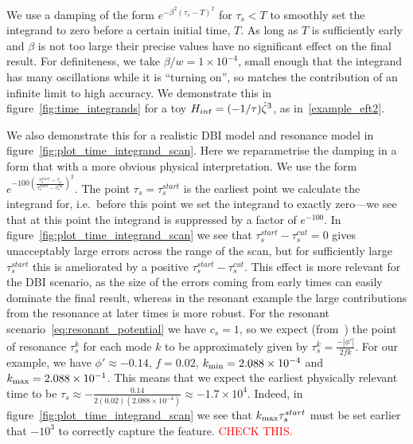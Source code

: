 We use a damping of the form $e^{-\beta^2{(\tau_s-T)}^2}$ for $\tau_s<T$ to smoothly
set the integrand to zero before a certain initial time, $T$.
As long as $T$ is sufficiently early and $\beta$ is not too large
their precise values have no significant effect on the final result.
For definiteness, we take $\beta/w=1\times10^{-4}$, small enough that
the integrand has many oscillations while it is ``turning on'',
so matches the contribution of an infinite limit to high accuracy.
We demonstrate this in figure~\ref{fig:time_integrands}
for a toy $H_{int}=(-1/\tau)\dot{\zeta}^3$,
as in~\eqref{example_eft2}.


We also demonstrate this for a realistic DBI model and resonance model
in figure~\ref{fig:plot_time_integrand_scan}.
Here we reparametrise the damping in a form that with a more obvious physical
interpretation.
We use the form $e^{-100{\left(\frac{{\tau_s^{start}-\tau_s}}{\tau_s^{start}-\tau_s^{cut}}\right)}^2}$.
The point $\tau_s=\tau_s^{start}$ is the earliest point we calculate the integrand for,
i.e.\ before this point we set the integrand to exactly zero---we
see that at this point the integrand is suppressed by a factor of $e^{-100}$.
In figure~\ref{fig:plot_time_integrand_scan} we see that $\tau_s^{start}-\tau_s^{cut}=0$
gives unacceptably large errors across the range of the scan, but for sufficiently large
$\tau_s^{start}$ this is ameliorated by a positive $\tau_s^{start}-\tau_s^{cut}$.
This effect is more relevant for the DBI scenario, as the size of the errors coming
from early times can easily dominate the final result, whereas in the resonant example
the large contributions from the resonance at later times is more robust.
For the resonant scenario~\eqref{eq:resonant_potential} we have $c_s=1$,
so we expect (from~\cite{flauger_pajer_resonant}) the point of resonance $\tau^k_s$
for each mode $k$ to be approximately given by $\tau^k_s = \frac{-\left|\phi'\right|}{2fk}$.
For our example, we have $\phi'\approx-0.14$, $f=0.02$, ${k_\text{min}}=2.088\times10^{-4}$ and ${k_\text{max}}=2.088\times10^{-1}$.
This means that we expect the earliest physically relevant time to be
$\tau_s\approx-\frac{0.14}{2(0.02)(2.088\times10^{-4})}\approx-1.7\times10^{4}$.
Indeed, in figure~\ref{fig:plot_time_integrand_scan} we see that ${k_\text{max}}\tau_s^{start}$ must be
set earlier that $-10^3$ to correctly capture the feature.
\textcolor{red}{CHECK THIS.}



